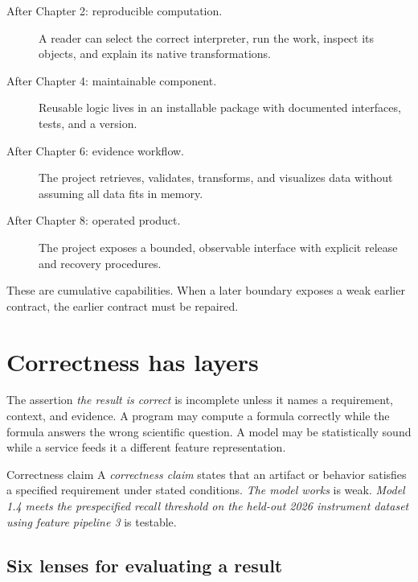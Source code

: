 \begin{description}
  \item[After Chapter 2: reproducible computation.] A reader can select the
  correct interpreter, run the work, inspect its objects, and explain its native
  transformations.
  \item[After Chapter 4: maintainable component.] Reusable logic lives in an
  installable package with documented interfaces, tests, and a version.
  \item[After Chapter 6: evidence workflow.] The project retrieves, validates,
  transforms, and visualizes data without assuming all data fits in memory.
  \item[After Chapter 8: operated product.] The project exposes a bounded,
  observable interface with explicit release and recovery procedures.
\end{description}

These are cumulative capabilities. When a later boundary exposes a weak earlier
contract, the earlier contract must be repaired.


\section{Correctness has layers}

The assertion \emph{the result is correct} is incomplete unless it names a
requirement, context, and evidence. A program may compute a formula correctly
while the formula answers the wrong scientific question. A model may be
statistically sound while a service feeds it a different feature
representation.

\begin{definitionbox}{Correctness claim}
A \emph{correctness claim} states that an artifact or behavior satisfies a
specified requirement under stated conditions. \emph{The model works} is weak.
\emph{Model 1.4 meets the prespecified recall threshold on the held-out 2026
instrument dataset using feature pipeline 3} is testable.
\end{definitionbox}

\subsection{Six lenses for evaluating a result}

